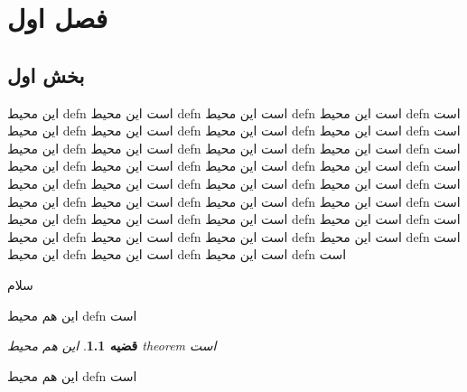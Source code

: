 \documentclass[10pt,a4paper]{book}
\theoremstyle{plain}
\theoremstyle{theorem}
\newtheorem{theorem}{قضیه}[section]
\begin{document}
\chapter{فصل اول}
\section{بخش اول}

\begin{defn}
این محیط defn  است این محیط defn  است این محیط defn  است این محیط defn  است این محیط defn  است این محیط defn  است این محیط defn  است این محیط defn  است این محیط defn  است این محیط defn  است این محیط defn  است این محیط defn  است این محیط defn  است این محیط defn  است این محیط defn  است این محیط defn  است این محیط defn  است این محیط defn  است این محیط defn  است این محیط defn  است این محیط defn  است این محیط defn  است این محیط defn  است این محیط defn  است این محیط defn  است این محیط defn  است این محیط defn  است این محیط defn  است این محیط defn  است این محیط defn  است این محیط defn  است این محیط defn  است این محیط defn  است این محیط defn  است این محیط defn  است
\end{defn}
سلام 

\begin{defn}
این هم محیط defn  است
\end{defn}
\begin{theorem}
این هم محیط theorem  است
\end{theorem}
\begin{defn}
این هم محیط defn  است
\end{defn}
\end{document}
